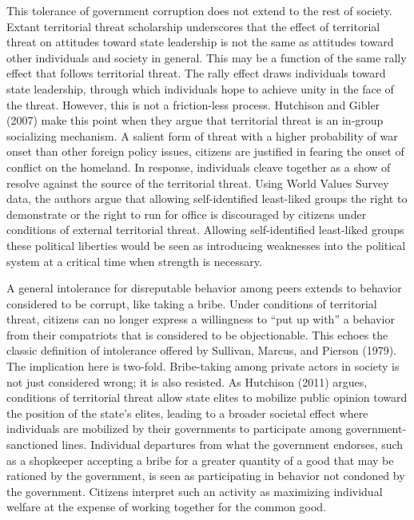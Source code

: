 \documentclass[11pt,]{article}
\begin{document}
This tolerance of government corruption does not extend to the rest of
society. Extant territorial threat scholarship underscores that the
effect of territorial threat on attitudes toward state leadership is not
the same as attitudes toward other individuals and society in general.
This may be a function of the same rally effect that follows territorial
threat. The rally effect draws individuals toward state leadership,
through which individuals hope to achieve unity in the face of the
threat. However, this is not a friction-less process. Hutchison and
Gibler (2007) make this point when they argue that territorial threat is
an in-group socializing mechanism. A salient form of threat with a
higher probability of war onset than other foreign policy issues,
citizens are justified in fearing the onset of conflict on the homeland.
In response, individuals cleave together as a show of resolve against
the source of the territorial threat. Using World Values Survey data,
the authors argue that allowing self-identified least-liked groups the
right to demonstrate or the right to run for office is discouraged by
citizens under conditions of external territorial threat. Allowing
self-identified least-liked groups these political liberties would be
seen as introducing weaknesses into the political system at a critical
time when strength is necessary.

A general intolerance for disreputable behavior among peers extends to
behavior considered to be corrupt, like taking a bribe. Under conditions
of territorial threat, citizens can no longer express a willingness to
``put up with'' a behavior from their compatriots that is considered to
be objectionable. This echoes the classic definition of intolerance
offered by Sullivan, Marcus, and Pierson (1979). The implication here is
two-fold. Bribe-taking among private actors in society is not just
considered wrong; it is also resisted. As Hutchison (2011) argues,
conditions of territorial threat allow state elites to mobilize public
opinion toward the position of the state's elites, leading to a broader
societal effect where individuals are mobilized by their governments to
participate among government-sanctioned lines. Individual departures
from what the government endorses, such as a shopkeeper accepting a
bribe for a greater quantity of a good that may be rationed by the
government, is seen as participating in behavior not condoned by the
government. Citizens interpret such an activity as maximizing individual
welfare at the expense of working together for the common good.
\end{document}

